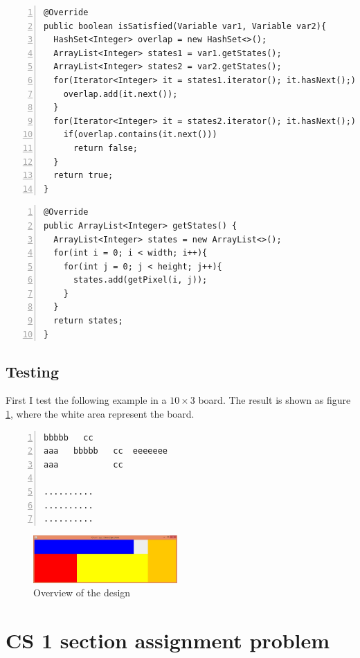 \documentclass{article}
\begin{document}
 

\begin{lstlisting}[numbers=left, caption=ConstraintsBoardLayout.class] 
@Override
public boolean isSatisfied(Variable var1, Variable var2){
  HashSet<Integer> overlap = new HashSet<>();
  ArrayList<Integer> states1 = var1.getStates();
  ArrayList<Integer> states2 = var2.getStates();
  for(Iterator<Integer> it = states1.iterator(); it.hasNext();){
    overlap.add(it.next());
  }
  for(Iterator<Integer> it = states2.iterator(); it.hasNext();){
    if(overlap.contains(it.next()))
      return false;
  }
  return true;
}
\end{lstlisting}

\begin{lstlisting}[numbers=left , caption=VariableBoradLayout.class]   
@Override
public ArrayList<Integer> getStates() {
  ArrayList<Integer> states = new ArrayList<>();
  for(int i = 0; i < width; i++){
    for(int j = 0; j < height; j++){
      states.add(getPixel(i, j));
    }
  }
  return states;
}
\end{lstlisting}


\subsection{Testing}
First I test the following example in a $10\times3$ board. The result is shown as figure \ref{boardlayout}, where the white area represent the board. 
\begin{lstlisting}[numbers=left]   
      bbbbb   cc
aaa   bbbbb   cc  eeeeeee
aaa           cc 

..........
..........
..........
\end{lstlisting}

\begin{figure}[!h]
\centering
\includegraphics[width=0.49\textwidth]{boardlayout.JPG}
\caption{Overview of the design}
\label{boardlayout}
\end{figure}









\section{CS 1 section assignment problem}
\end{document}
